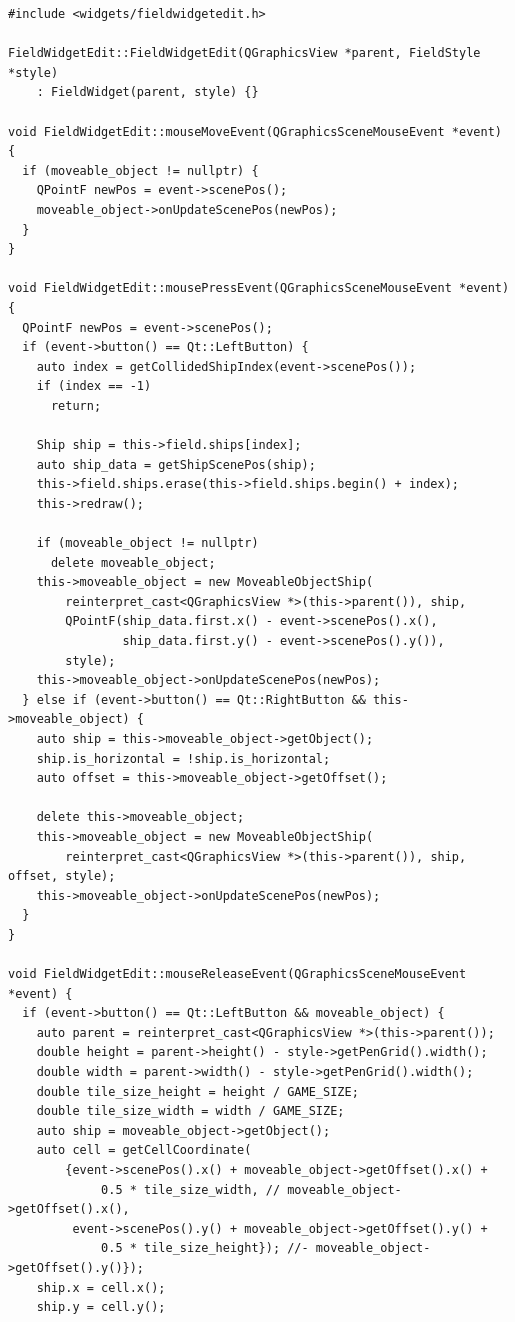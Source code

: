 \documentclass[a4paper,14pt]{extarticle}
\begin{document}
\begin{verbatim}
#include <widgets/fieldwidgetedit.h>

FieldWidgetEdit::FieldWidgetEdit(QGraphicsView *parent, FieldStyle *style)
    : FieldWidget(parent, style) {}

void FieldWidgetEdit::mouseMoveEvent(QGraphicsSceneMouseEvent *event) {
  if (moveable_object != nullptr) {
    QPointF newPos = event->scenePos();
    moveable_object->onUpdateScenePos(newPos);
  }
}

void FieldWidgetEdit::mousePressEvent(QGraphicsSceneMouseEvent *event) {
  QPointF newPos = event->scenePos();
  if (event->button() == Qt::LeftButton) {
    auto index = getCollidedShipIndex(event->scenePos());
    if (index == -1)
      return;

    Ship ship = this->field.ships[index];
    auto ship_data = getShipScenePos(ship);
    this->field.ships.erase(this->field.ships.begin() + index);
    this->redraw();

    if (moveable_object != nullptr)
      delete moveable_object;
    this->moveable_object = new MoveableObjectShip(
        reinterpret_cast<QGraphicsView *>(this->parent()), ship,
        QPointF(ship_data.first.x() - event->scenePos().x(),
                ship_data.first.y() - event->scenePos().y()),
        style);
    this->moveable_object->onUpdateScenePos(newPos);
  } else if (event->button() == Qt::RightButton && this->moveable_object) {
    auto ship = this->moveable_object->getObject();
    ship.is_horizontal = !ship.is_horizontal;
    auto offset = this->moveable_object->getOffset();

    delete this->moveable_object;
    this->moveable_object = new MoveableObjectShip(
        reinterpret_cast<QGraphicsView *>(this->parent()), ship, offset, style);
    this->moveable_object->onUpdateScenePos(newPos);
  }
}

void FieldWidgetEdit::mouseReleaseEvent(QGraphicsSceneMouseEvent *event) {
  if (event->button() == Qt::LeftButton && moveable_object) {
    auto parent = reinterpret_cast<QGraphicsView *>(this->parent());
    double height = parent->height() - style->getPenGrid().width();
    double width = parent->width() - style->getPenGrid().width();
    double tile_size_height = height / GAME_SIZE;
    double tile_size_width = width / GAME_SIZE;
    auto ship = moveable_object->getObject();
    auto cell = getCellCoordinate(
        {event->scenePos().x() + moveable_object->getOffset().x() +
             0.5 * tile_size_width, // moveable_object->getOffset().x(),
         event->scenePos().y() + moveable_object->getOffset().y() +
             0.5 * tile_size_height}); //- moveable_object->getOffset().y()});
    ship.x = cell.x();
    ship.y = cell.y();


\end{verbatim}
\end{document}
